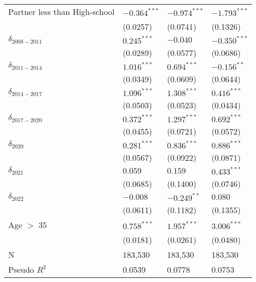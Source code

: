 \begin{tabular}{llll}
Partner less than High-school &     $-0.364^{***}$ &     $-0.974^{***}$ &     $-1.793^{***}$ \\
                              &           (0.0257) &           (0.0741) &           (0.1326) \\
$\delta_{2008-2011}$          &      $0.245^{***}$ &           $-0.040$ &     $-0.350^{***}$ \\
                              &           (0.0289) &           (0.0577) &           (0.0686) \\
$\delta_{2011-2014}$          &      $1.016^{***}$ &      $0.694^{***}$ &      $-0.156^{**}$ \\
                              &           (0.0349) &           (0.0609) &           (0.0644) \\
$\delta_{2014-2017}$          &      $1.096^{***}$ &      $1.308^{***}$ &      $0.416^{***}$ \\
                              &           (0.0503) &           (0.0523) &           (0.0434) \\
$\delta_{2017-2020}$          &      $0.372^{***}$ &      $1.297^{***}$ &      $0.692^{***}$ \\
                              &           (0.0455) &           (0.0721) &           (0.0572) \\
$\delta_{2020}$               &      $0.281^{***}$ &      $0.836^{***}$ &      $0.886^{***}$ \\
                              &           (0.0567) &           (0.0922) &           (0.0871) \\
$\delta_{2021}$               &            $0.059$ &            $0.159$ &      $0.433^{***}$ \\
                              &           (0.0685) &           (0.1400) &           (0.0746) \\
$\delta_{2022}$               &           $-0.008$ &      $-0.249^{**}$ &            $0.080$ \\
                              &           (0.0611) &           (0.1182) &           (0.1355) \\
Age $>$ 35                    &      $0.758^{***}$ &      $1.957^{***}$ &      $3.006^{***}$ \\
                              &           (0.0181) &           (0.0261) &           (0.0480) \\
N                             &            183,530 &            183,530 &            183,530 \\
Pseudo $R^2$                  &             0.0539 &             0.0778 &             0.0753 \\
\bottomrule
\end{tabular}
